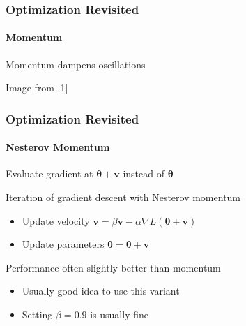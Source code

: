 \documentclass[xetex,professionalfont]{beamer}
\renewcommand\emph[1]{\textcolor{tuwcvl_cvl_blue}{#1}}
\renewcommand{\vec}[1]{\ensuremath{\mathbf{#1}}}
\newcommand{\vv}{\vec{v}}
\newcommand{\bth}{\boldsymbol{\theta}}
\begin{document}
\begin{frame}
\frametitle{Optimization Revisited}
\framesubtitle{Momentum}

Momentum dampens oscillations

\bigskip

\begin{center}
{\centering Image from [1]}
\end{center}

\end{frame}


\begin{frame}
\frametitle{Optimization Revisited}
\framesubtitle{Nesterov Momentum}

Evaluate gradient at $\bth+\vv$ instead of $\bth$ %

\bigskip

Iteration of gradient descent with \emph{Nesterov momentum}
\begin{itemize}
    \item Update velocity $\vv = \beta\vv - \alpha \nabla L(\bth+\vv)$
    \item Update parameters $\bth = \bth + \vv$
\end{itemize}

\bigskip

Performance often slightly better than momentum
\begin{itemize}
    \item Usually good idea to use this variant
    \item Setting $\beta=0.9$ is usually fine
\end{itemize}

\end{frame}
\end{document}
